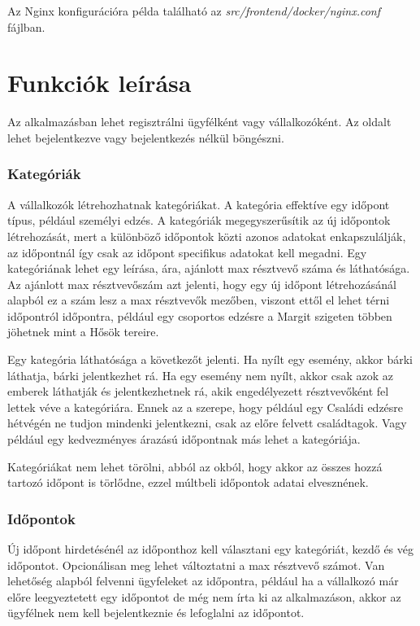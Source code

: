 Az Nginx konfigurációra példa található az \textit{src/frontend/docker/nginx.conf} fájlban.

\clearpage

\section{Funkciók leírása}
\label{sec:functionDefinitions}

Az alkalmazásban lehet regisztrálni ügyfélként vagy vállalkozóként. Az oldalt lehet bejelentkezve vagy bejelentkezés nélkül böngészni.

\subsubsection{Kategóriák}

A vállalkozók létrehozhatnak kategóriákat. A kategória effektíve egy időpont típus, például személyi edzés. A kategóriák megegyszerűsítik az új időpontok létrehozását, mert a különböző időpontok közti azonos adatokat enkapszulálják, az időpontnál így csak az időpont specifikus adatokat kell megadni. Egy kategóriának lehet egy leírása, ára, ajánlott max résztvevő száma és láthatósága. Az ajánlott max résztvevőszám azt jelenti, hogy egy új időpont létrehozásánál alapból ez a szám lesz a max résztvevők mezőben, viszont ettől el lehet térni időpontról időpontra, például egy csoportos edzésre a Margit szigeten többen jöhetnek mint a Hősök tereire.

Egy kategória láthatósága a következőt jelenti. Ha nyílt egy esemény, akkor bárki láthatja, bárki jelentkezhet rá. Ha egy esemény nem nyílt, akkor csak azok az emberek láthatják és jelentkezhetnek rá, akik engedélyezett résztvevőként fel lettek véve a kategóriára. Ennek az a szerepe, hogy például egy Családi edzésre hétvégén ne tudjon mindenki jelentkezni, csak az előre felvett családtagok. Vagy például egy kedvezményes árazású időpontnak más lehet a kategóriája.

Kategóriákat nem lehet törölni, abból az okból, hogy akkor az összes hozzá tartozó időpont is törlődne, ezzel múltbeli időpontok adatai elvesznének.

\subsubsection{Időpontok}

Új időpont hirdetésénél az időponthoz kell választani egy kategóriát, kezdő és vég időpontot. Opcionálisan meg lehet változtatni a max résztvevő számot. Van lehetőség alapból felvenni ügyfeleket az időpontra, például ha a vállalkozó már előre leegyeztetett egy időpontot de még nem írta ki az alkalmazáson, akkor az ügyfélnek nem kell bejelentkeznie és lefoglalni az időpontot.

